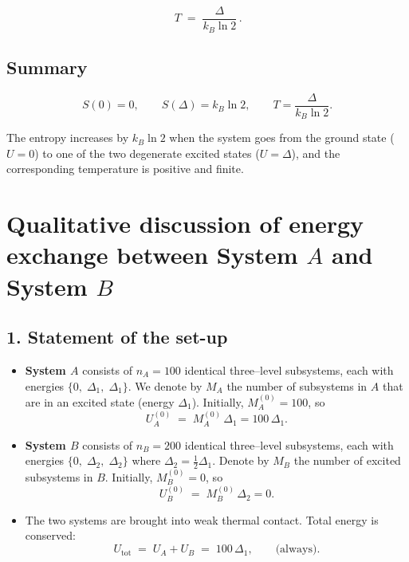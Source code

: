 \documentclass[12pt]{article}
\theoremstyle{definition} %
\theoremstyle{plain} %
\begin{document}
\[
  \boxed{\, T \;=\; \dfrac{\Delta}{k_B \ln 2}\, }.
\]

\subsection*{Summary}

\[
  S(0)=0, 
  \qquad 
  S(\Delta)=k_B\ln 2,
  \qquad
  T=\frac{\Delta}{k_B\ln 2}.
\]

The entropy increases by \(k_B\ln 2\) when the system goes from the ground state (\(U=0\)) to one of the two degenerate excited states (\(U=\Delta\)), and the corresponding temperature is positive and finite.
\section*{Qualitative discussion of energy exchange between System \(A\) and System \(B\)}

\subsection*{1.  Statement of the set-up}

\begin{itemize}
  \item \textbf{System \(A\)} consists of \(n_A = 100\) identical three–level subsystems, each with
        energies \(\{0,\;\Delta_1,\;\Delta_1\}\).
        We denote by \(M_A\) the number of subsystems in \(A\) that are in an excited state
        (energy \(\Delta_1\)).  Initially, \(\boxed{M_A^{(0)} = 100}\), so
        \[
            U_A^{(0)} \;=\; M_A^{(0)} \,\Delta_1 = 100\,\Delta_1 .
        \]

  \item \textbf{System \(B\)} consists of \(n_B = 200\) identical three–level subsystems, each with
        energies \(\{0,\;\Delta_2,\;\Delta_2\}\) where \(\displaystyle \Delta_2 = \tfrac12\Delta_1\).
        Denote by \(M_B\) the number of excited subsystems in \(B\).
        Initially, \(\boxed{M_B^{(0)} = 0}\), so
        \[
            U_B^{(0)} \;=\; M_B^{(0)} \,\Delta_2 = 0 .
        \]

  \item The two systems are brought into weak thermal contact.
        Total energy is conserved:
        \[
            U_{\text{tot}}
            \;=\;
            U_A + U_B
            \;=\;
            100\,\Delta_1
            ,
            \qquad
            \text{(always)} .
        \]
\end{itemize}
\end{document}
